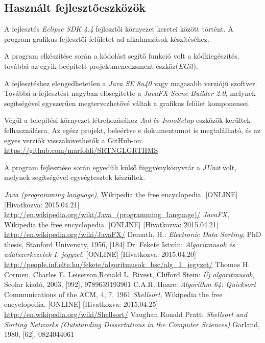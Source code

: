 \documentclass{elteikthesis}
\begin{document}
\subsection{Használt fejlesztőeszközök}
A fejlesztés \emph{Eclipse SDK 4.4} fejlesztői környezet keretei között történt. A program grafikus fejlesztői felületet ad alkalmazások készítéséhez.\par
A program elkészítése során a kódolást segítő funkció volt a kódkiegészítés, továbbá az egyik beépített projektmenedzsment eszköz(\emph{EGit}).\par
A fejlesztéshez elengedhetetlen a \emph{Java SE 8u40} vagy magasabb verziójú szoftver. Továbbá a fejlesztést nagyban elősegítette a \emph{JavaFX Scene Builder 2.0}, melynek segítségével egyszerűen megtervezhetővé váltak a grafikus felület komponensei.\par
Végül a telepítési környezet létrehozásához \emph{Ant} és \emph{InnoSetup} eszközök kerültek felhasználásra.
Az egész projekt, beleértve e dokumentumot is megtalálható, és az egyes verziók visszakövethetők a GitHub-on: \url{https://github.com/marfoldi/SRTNGLGRTHMS}\par
A program fejlesztése során egyedüli külső függvénykönyvtár a \emph{JUnit} volt, melynek segítségével egységtesztek készültek.

\begin{thebibliography}{widest entry}
\emph{Java (programming language)},
Wikipedia the free encyclopedia.
[ONLINE] [Hivatkozva: 2015.04.21]
\url{http://en.wikipedia.org/wiki/Java_(programming_language)/}
\emph{JavaFX},
Wikipedia the free encyclopedia.
[ONLINE] [Hivatkozva: 2015.04.21]
\url{http://en.wikipedia.org/wiki/JavaFX/}
Demuth, H.:
\emph{Electronic Data Sorting},
PhD thesis, Stanford University,
1956, [184]
Dr. Fekete István:
\emph{Algoritmusok és adatszerkezetek I. jegyzet},
[ONLINE] [Hivatkozva: 2015.04.20] \url{http://people.inf.elte.hu/fekete/algoritmusok_bsc/alg_1_jegyzet/}
Thomas H. Cormen, Charles E. Leiserson,Ronald L. Rivest, Clifford Stein:
\emph{Új algoritmusok},
Scolar kiadó, 2003,
[992], 9789639193901
C.A.R. Hoare:
\emph{Algorithm 64: Quicksort}
Communications of the ACM, 4, 7, 1961
\emph{Shellsort},
Wikipedia the free encyclopedia.
[ONLINE] [Hivatkozva: 2015.04.25]
\url{http://en.wikipedia.org/wiki/Shellsort/}
Vaughan Ronald Pratt:
\emph{Shellsort and Sorting Networks (Outstanding Dissertations in the Computer Sciences)}
Garland, 1980, [62], 0824044061 
\end{thebibliography}
\end{document}
